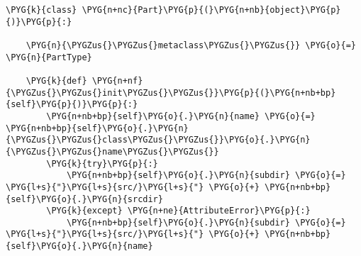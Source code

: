 \begin{Verbatim}[commandchars=\\\{\}]
\PYG{k}{class} \PYG{n+nc}{Part}\PYG{p}{(}\PYG{n+nb}{object}\PYG{p}{)}\PYG{p}{:}

    \PYG{n}{\PYGZus{}\PYGZus{}metaclass\PYGZus{}\PYGZus{}} \PYG{o}{=} \PYG{n}{PartType}

    \PYG{k}{def} \PYG{n+nf}{\PYGZus{}\PYGZus{}init\PYGZus{}\PYGZus{}}\PYG{p}{(}\PYG{n+nb+bp}{self}\PYG{p}{)}\PYG{p}{:}
        \PYG{n+nb+bp}{self}\PYG{o}{.}\PYG{n}{name} \PYG{o}{=} \PYG{n+nb+bp}{self}\PYG{o}{.}\PYG{n}{\PYGZus{}\PYGZus{}class\PYGZus{}\PYGZus{}}\PYG{o}{.}\PYG{n}{\PYGZus{}\PYGZus{}name\PYGZus{}\PYGZus{}}
        \PYG{k}{try}\PYG{p}{:}
            \PYG{n+nb+bp}{self}\PYG{o}{.}\PYG{n}{subdir} \PYG{o}{=} \PYG{l+s}{"}\PYG{l+s}{src/}\PYG{l+s}{"} \PYG{o}{+} \PYG{n+nb+bp}{self}\PYG{o}{.}\PYG{n}{srcdir}
        \PYG{k}{except} \PYG{n+ne}{AttributeError}\PYG{p}{:}
            \PYG{n+nb+bp}{self}\PYG{o}{.}\PYG{n}{subdir} \PYG{o}{=} \PYG{l+s}{"}\PYG{l+s}{src/}\PYG{l+s}{"} \PYG{o}{+} \PYG{n+nb+bp}{self}\PYG{o}{.}\PYG{n}{name}


\end{Verbatim}
